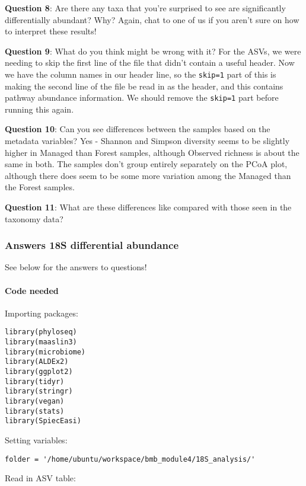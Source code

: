 \documentclass[
]{book}
\begin{document}
\textbf{Question 8}: Are there any taxa that you're surprised to see are significantly differentially abundant? Why?
Again, chat to one of us if you aren't sure on how to interpret these results!

\textbf{Question 9}: What do you think might be wrong with it?
For the ASVs, we were needing to skip the first line of the file that didn't contain a useful header. Now we have the column names in our header line, so the \texttt{skip=1} part of this is making the second line of the file be read in as the header, and this contains pathway abundance information. We should remove the \texttt{skip=1} part before running this again.

\textbf{Question 10}: Can you see differences between the samples based on the metadata variables?
Yes - Shannon and Simpson diversity seems to be slightly higher in Managed than Forest samples, although Observed richness is about the same in both. The samples don't group entirely separately on the PCoA plot, although there does seem to be some more variation among the Managed than the Forest samples.

\textbf{Question 11}: What are these differences like compared with those seen in the taxonomy data?

\subsubsection{Answers 18S differential abundance}\label{answers-18s-differential-abundance}

See below for the answers to questions!

\paragraph{Code needed}\label{code-needed}

Importing packages:

\begin{verbatim}
library(phyloseq)
library(maaslin3)
library(microbiome)
library(ALDEx2)
library(ggplot2)
library(tidyr)
library(stringr)
library(vegan)
library(stats)
library(SpiecEasi)
\end{verbatim}

Setting variables:

\begin{verbatim}
folder = '/home/ubuntu/workspace/bmb_module4/18S_analysis/'
\end{verbatim}

Read in ASV table:
\end{document}

